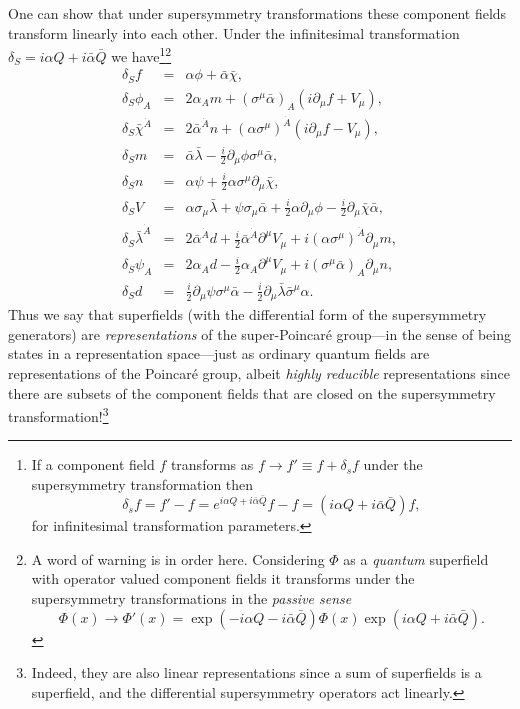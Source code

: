 \documentclass[notes.tex]{subfiles}
\begin{document}
One can show that under supersymmetry transformations these component fields transform linearly into each other. Under the infinitesimal transformation $\delta_S=i\alpha Q+i\bar\alpha \bar Q$ we have\footnote{If a component field $f$ transforms as $f\to f' \equiv f+\delta_sf$ under the supersymmetry transformation then \[\delta_sf= f'-f =e^{i\alpha Q+i\bar\alpha\bar Q}f -f=(i\alpha Q+i\bar\alpha \bar Q)f, \] for infinitesimal transformation parameters.}\footnote{A word of warning is in order here. Considering $\Phi$ as a {\it quantum} superfield with operator valued component fields it transforms under the supersymmetry transformations in the {\it passive sense}  
\[ \Phi(x)\to \Phi'(x)=\exp{(-i\alpha Q-i\bar\alpha \bar Q)}\Phi(x)\exp{(i\alpha Q+i\bar\alpha \bar Q)}. \]}
\begin{eqnarray}
\delta_S f &=& \alpha\phi +\bar\alpha\bar\chi, \label{eq:general_superfield_f_component_transform} \\
\delta_S\phi_A &=& 2 \alpha_A m + (\sigma^\mu \bar\alpha)_A (i\partial_\mu f + V_\mu), \\
\delta_S\bar\chi^{\dot A} &=& 2 \bar\alpha^{\dot A} n + (\alpha \sigma^\mu)^{\dot A} (i\partial_\mu f - V_\mu), \\
\delta_S m &=& \bar\alpha\bar\lambda-\frac{i}{2}\partial_\mu\phi\sigma^\mu\bar\alpha, \\
\delta_S n &=& \alpha\psi+\frac{i}{2}\alpha\sigma^\mu\partial_\mu\bar\chi, \\
\delta_S V &=& \alpha\sigma_\mu\bar\lambda + \psi\sigma_\mu\bar\alpha + \frac{i}{2}\alpha\partial_\mu\phi -\frac{i}{2}\partial_\mu\bar\chi\bar\alpha, \\
\delta_S\bar\lambda^{\dot A} &=& 2\bar\alpha^{\dot A} d+\frac{i}{2}\bar\alpha^{\dot A}\partial^\mu V_\mu+i(\alpha\sigma^\mu)^{\dot A}\partial_\mu m, \\
\delta_S\psi_A &=& 2\alpha_A d-\frac{i}{2}\alpha_A \partial^\mu V_\mu+i(\sigma^\mu\bar\alpha)_A \partial_\mu n, \\
\delta_S d  &=& \frac{i}{2}\partial_\mu\psi\sigma^\mu\bar\alpha-\frac{i}{2}\partial_\mu\bar\lambda\bar\sigma^\mu\alpha. \label{eq:general_superfield_d_component_transform}
\end{eqnarray}
Thus we say that superfields (with the differential form of the supersymmetry generators) are {\it representations} of the super-Poincar\'e group---in the sense of being states in a representation space---just as ordinary quantum fields are representations of the Poincaré group, albeit {\it highly reducible} representations since there are subsets of the component fields that are closed on the supersymmetry transformation!\footnote{Indeed, they are also linear representations since a sum of superfields is a superfield, and the differential supersymmetry operators act linearly.} 
\end{document}
